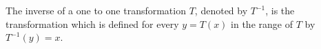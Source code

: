 The inverse of a one to one transformation $T$, denoted by $T^{-1}$, is the transformation which is defined for every $y = T(x)$ in the range of $T$ by $T^{-1}(y) = x$.
